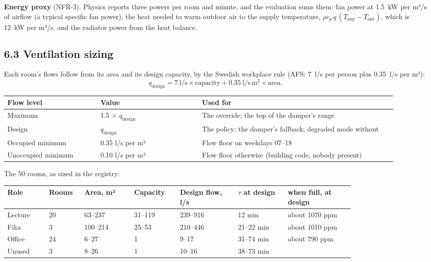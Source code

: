 \textbf{Energy proxy} (NFR-3). Physics reports three powers per room and
minute, and the evaluation sums them: fan power at 1.5~kW per m³/s of airflow
(a typical specific fan power), the heat needed to warm outdoor air to the
supply temperature, $\rho c_p\,q\,(T_{\mathrm{sup}} - T_{\mathrm{out}})$, which
is 12~kW per m³/s, and the radiator power from the heat balance.

\subsection{6.3 Ventilation sizing}

Each room's flows follow from its area and its design capacity, by the Swedish
workplace rule (AFS: 7~l/s per person plus 0.35~l/s per m²):
\[
q_{\mathrm{design}} = 7\ \mathrm{l/s}\times\text{capacity} + 0.35\ \mathrm{l/s\,m^2}\times\text{area}.
\]

\begin{longtable}[]{@{}L{0.22\linewidth}L{0.24\linewidth}L{0.46\linewidth}@{}}
\toprule
\textbf{Flow level} & \textbf{Value} & \textbf{Used for} \\
\midrule
\endhead
Maximum & 1.5 × $q_{\mathrm{design}}$ & The \COtwo{} override; the top of the damper's range \\
Design & $q_{\mathrm{design}}$ & The  policy; the damper's fallback; degraded mode without \COtwo{} \\
Occupied minimum & 0.35 l/s per m² & Flow floor on weekdays 07--18 \\
Unoccupied minimum & 0.10 l/s per m² & Flow floor otherwise (building code, nobody present) \\
\bottomrule
\end{longtable}

The 50 rooms, as sized in the registry:

\begin{longtable}[]{@{}L{0.10\linewidth}L{0.07\linewidth}L{0.12\linewidth}L{0.11\linewidth}L{0.14\linewidth}L{0.12\linewidth}L{0.16\linewidth}@{}}
\toprule
\textbf{Role} & \textbf{Rooms} & \textbf{Area, m²} & \textbf{Capacity} & \textbf{Design flow, l/s} & \textbf{$\tau$ at design} & \textbf{\COtwo{} when full, at design} \\
\midrule
\endhead
Lecture & 20 & 63--237 & 31--119 & 239--916 & 12 min & about 1070 ppm \\
Fika & 3 & 100--214 & 25--53 & 210--446 & 21--22 min & about 1010 ppm \\
Office & 24 & 6--27 & 1 & 9--17 & 31--74 min & about 790 ppm \\
Unused & 3 & 8--26 & 1 & 10--16 & 38--73 min & \\
\bottomrule
\end{longtable}

